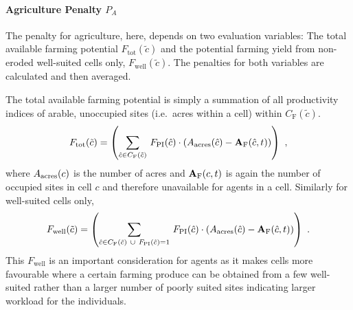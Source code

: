 



\paragraph{Agriculture Penalty $P_A$}
The penalty for agriculture, here, depends on two evaluation variables: 
The total available farming potential $F_\text{tot}(\tilde{c})$ and the potential farming yield from non-eroded well-suited cells only, $F_\text{well}(\tilde{c})$.
The penalties for both variables are calculated and then averaged.

The total available farming potential is simply a summation of all productivity indices of arable, unoccupied sites (i.e.\ acres within a cell) within $C_\text{F}(\tilde{c})$.
\begin{equation}
	F_\text{tot}(\tilde{c}) = \left( \sum_{\hat{c} \in C_{\rm F}(\tilde{c}) }\, F_{\rm PI}(\hat{c}) \cdot (A_{\rm acres}(\hat{c})  - \mathbf{A}_{\rm F}(\hat{c}, t) )\right) \ ,
\end{equation}
where $A_{\rm acres}(c)$ is the number of acres and $ \mathbf{A}_{\rm F}(c,t)$ is again the number of occupied sites in cell $c$ and therefore unavailable for agents in a cell.
Similarly for well-suited cells only, 
\begin{equation}
	F_\text{well}(\tilde{c}) = \left( \sum_{\hat{c} \in C_{\rm F}(\tilde{c}) \ \cup \ F_{\rm PI}(\hat{c})=1} \, F_{\rm PI}(\hat{c}) \cdot (A_{\rm acres}(\hat{c})  - \mathbf{A}_{\rm F}(\hat{c},t) )\right) \ .
\end{equation}
This $F_\text{well}$ is an important consideration for agents as it makes cells
more favourable where a certain farming produce can be obtained from a few well-suited rather than a larger number of poorly suited sites indicating larger workload for the individuals.

